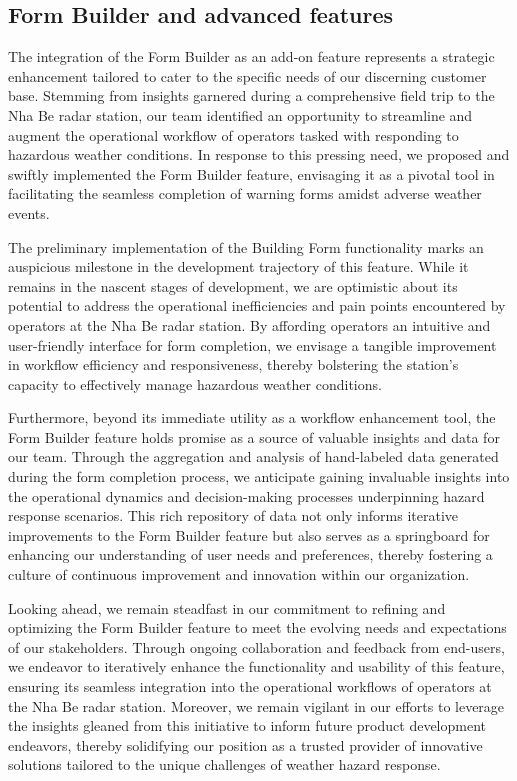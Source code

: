 \subsection{Form Builder and advanced features}
The integration of the Form Builder as an add-on feature represents a strategic
enhancement tailored to cater to the specific needs of our discerning customer
base. Stemming from insights garnered during a comprehensive field trip to the
Nha Be radar station, our team identified an opportunity to streamline and
augment the operational workflow of operators tasked with responding to
hazardous weather conditions. In response to this pressing need, we proposed and
swiftly implemented the Form Builder feature, envisaging it as a pivotal tool in
facilitating the seamless completion of warning forms amidst adverse weather
events.

The preliminary implementation of the Building Form functionality marks an
auspicious milestone in the development trajectory of this feature. While it
remains in the nascent stages of development, we are optimistic about its
potential to address the operational inefficiencies and pain points encountered
by operators at the Nha Be radar station. By affording operators an intuitive
and user-friendly interface for form completion, we envisage a tangible
improvement in workflow efficiency and responsiveness, thereby bolstering the
station's capacity to effectively manage hazardous weather conditions.

Furthermore, beyond its immediate utility as a workflow enhancement tool, the
Form Builder feature holds promise as a source of valuable insights and data for
our team. Through the aggregation and analysis of hand-labeled data generated
during the form completion process, we anticipate gaining invaluable insights
into the operational dynamics and decision-making processes underpinning hazard
response scenarios. This rich repository of data not only informs iterative
improvements to the Form Builder feature but also serves as a springboard for
enhancing our understanding of user needs and preferences, thereby fostering a
culture of continuous improvement and innovation within our organization.

Looking ahead, we remain steadfast in our commitment to refining and optimizing
the Form Builder feature to meet the evolving needs and expectations of our
stakeholders. Through ongoing collaboration and feedback from end-users, we
endeavor to iteratively enhance the functionality and usability of this feature,
ensuring its seamless integration into the operational workflows of operators at
the Nha Be radar station. Moreover, we remain vigilant in our efforts to
leverage the insights gleaned from this initiative to inform future product
development endeavors, thereby solidifying our position as a trusted provider of
innovative solutions tailored to the unique challenges of weather hazard
response.

